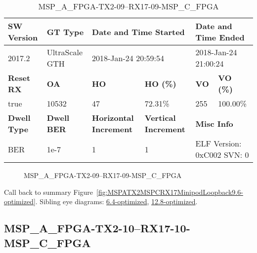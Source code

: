 \begin{table}[h]
\centering
\caption{MSP\_A\_FPGA-TX2-09--RX17-09-MSP\_C\_FPGA}
\label{tab:MSPAFPGATX209RX1709MSPCFPGA9.6-optimized}
\begin{tabular}{@{}|l|l|l|l|l|l|@{}}
\toprule
\textbf{SW Version}                & \textbf{GT Type}   & \multicolumn{2}{l|}{\textbf{Date and Time Started}}            & \multicolumn{2}{l|}{\textbf{Date and Time Ended}}        \\ \midrule
2017.2                       & UltraScale GTH          & \multicolumn{2}{l|}{2018-Jan-24 20:59:54}                   & \multicolumn{2}{l|}{2018-Jan-24 21:00:24}               \\ \midrule
\textbf{Reset RX}                  & \textbf{OA} & \textbf{HO}   & \textbf{HO (\%)} & \textbf{VO} & \textbf{VO (\%)} \\ \midrule
true & 10532        & 47          & 72.31\%        & 255        & 100.00\%       \\ \midrule
\textbf{Dwell Type}                & \textbf{Dwell BER} & \textbf{Horizontal Increment} & \textbf{Vertical Increment}    & \multicolumn{2}{l|}{\textbf{Misc Info}}                  \\ \midrule
BER                            & 1e-7        & 1        & 1           & \multicolumn{2}{l|}{ELF Version: 0xC002 SVN: 0}                         \\ \bottomrule
\end{tabular}
\end{table}

\begin{figure}[h]
\caption{MSP\_A\_FPGA-TX2-09--RX17-09-MSP\_C\_FPGA} \label{fig:MSPAFPGATX209RX1709MSPCFPGA9.6-optimized}
\end{figure}

Call back to summary Figure~\ref{fig:MSPATX2MSPCRX17MinipodLoopback9.6-optimized}.
Sibling eye diagrams: \hyperref[sec:MSPAFPGATX209RX1709MSPCFPGA6.4-optimized]{6.4-optimized}, \hyperref[sec:MSPAFPGATX209RX1709MSPCFPGA12.8-optimized]{12.8-optimized}.

\clearpage
\newpage


\subsection{MSP\_A\_FPGA-TX2-10--RX17-10-MSP\_C\_FPGA}\label{sec:MSPAFPGATX210RX1710MSPCFPGA9.6-optimized}

